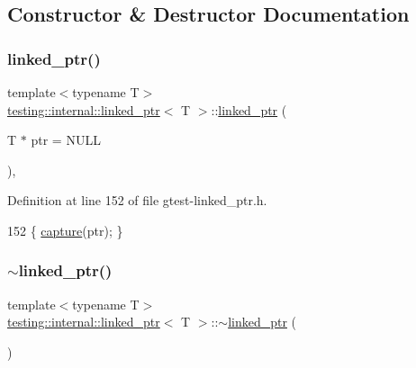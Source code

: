 \subsection{Constructor \& Destructor Documentation}
\mbox{\label{classtesting_1_1internal_1_1linked__ptr_ae805418b9f03f14ff49649e710475dba}} 
\subsubsection{\texorpdfstring{linked\+\_\+ptr()}{linked\_ptr()}\hspace{0.1cm}{\footnotesize\ttfamily [1/3]}}
{\footnotesize\ttfamily template$<$typename T$>$ \\
\hyperlink{classtesting_1_1internal_1_1linked__ptr}{testing\+::internal\+::linked\+\_\+ptr}$<$ T $>$\+::\hyperlink{classtesting_1_1internal_1_1linked__ptr}{linked\+\_\+ptr} (\begin{DoxyParamCaption}\item[{T $\ast$}]{ptr = {\ttfamily NULL} }\end{DoxyParamCaption})\hspace{0.3cm}{\ttfamily [inline]}, {\ttfamily [explicit]}}



Definition at line 152 of file gtest-\/linked\+\_\+ptr.\+h.


\begin{DoxyCode}
152 \{ \hyperlink{classtesting_1_1internal_1_1linked__ptr_a0b4623795339fd29bf9303f926ae2824}{capture}(ptr); \}
\end{DoxyCode}
\mbox{\label{classtesting_1_1internal_1_1linked__ptr_af99460fd09ca0f83e061ea480ef1a45e}} 
\subsubsection{\texorpdfstring{$\sim$linked\+\_\+ptr()}{~linked\_ptr()}}
{\footnotesize\ttfamily template$<$typename T$>$ \\
\hyperlink{classtesting_1_1internal_1_1linked__ptr}{testing\+::internal\+::linked\+\_\+ptr}$<$ T $>$\+::$\sim$\hyperlink{classtesting_1_1internal_1_1linked__ptr}{linked\+\_\+ptr} (\begin{DoxyParamCaption}{ }\end{DoxyParamCaption})\hspace{0.3cm}{\ttfamily [inline]}}



